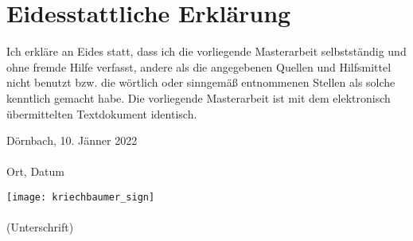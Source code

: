 \documentclass[../main.tex]{subfiles}
\begin{document}
\section*{Eidesstattliche Erklärung}
Ich erkläre an Eides statt, dass ich die vorliegende Masterarbeit selbstständig und ohne fremde Hilfe verfasst, andere als die angegebenen Quellen und Hilfsmittel nicht benutzt bzw. die wörtlich oder sinngemäß entnommenen Stellen als solche kenntlich gemacht habe. Die vorliegende Masterarbeit ist mit dem elektronisch übermittelten Textdokument identisch.\\[5cm]
    \noindent
    \begin{minipage}[h]{0.4\linewidth}
      \begin{center}
        Dörnbach, 10. Jänner 2022\\              
        \dotfill\\
        Ort, Datum
      \end{center}
    \end{minipage}
    \hspace*{0.1\linewidth}
    \begin{minipage}[h]{0.5\linewidth}
      \vspace*{-0.28in}
      \begin{center}
        \texttt{[image: kriechbaumer\_sign]}\\
        \vspace*{-0.15in}
        \dotfill\\
        (Unterschrift)
      \end{center}
    \end{minipage}
\end{document}
